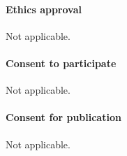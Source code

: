 \vspace{-1em}
\paragraph{\large Ethics approval}
Not applicable.

\vspace{-1em}
\paragraph{\large Consent to participate}
Not applicable.

\vspace{-1em}
\paragraph{\large Consent for publication}
Not applicable.
